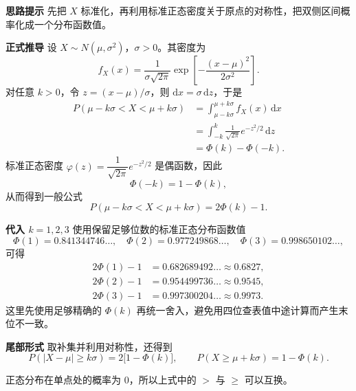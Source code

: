 \clearpage
\begin{proofbox}
	\textbf{\textcolor{CProof}{思路提示}}
	先把 $X$ 标准化，再利用标准正态密度关于原点的对称性，把双侧区间概率化成一个分布函数值。

	\medskip
	\textbf{\textcolor{CProof}{正式推导}}
	设 $X\sim N(\mu,\sigma^{2})$，$\sigma>0$。其密度为
	\[
		f_X(x)=\frac{1}{\sigma\sqrt{2\pi}}
		\exp\!\left[-\frac{(x-\mu)^2}{2\sigma^2}\right].
	\]
	对任意 $k>0$，令 $z=(x-\mu)/\sigma$，则 $\mathrm{d}x=\sigma\,\mathrm{d}z$，于是
	\[
		\begin{aligned}
			P(\mu-k\sigma<X<\mu+k\sigma)
			&=\int_{\mu-k\sigma}^{\mu+k\sigma}f_X(x)\,\mathrm{d}x\\
			&=\int_{-k}^{k}\frac{1}{\sqrt{2\pi}}e^{-z^{2}/2}\,\mathrm{d}z\\
			&=\Phi(k)-\Phi(-k).
		\end{aligned}
	\]
	标准正态密度 $\varphi(z)=\dfrac{1}{\sqrt{2\pi}}e^{-z^2/2}$ 是偶函数，因此
	\[
		\Phi(-k)=1-\Phi(k),
	\]
	从而得到一般公式
	\[
		P(\mu-k\sigma<X<\mu+k\sigma)=2\Phi(k)-1.
	\]

	\medskip
	\textbf{\textcolor{CProof}{代入 $k=1,2,3$}}
	使用保留足够位数的标准正态分布函数值
	\[
		\Phi(1)=0.841344746\ldots,\quad
		\Phi(2)=0.977249868\ldots,\quad
		\Phi(3)=0.998650102\ldots,
	\]
	可得
	\[
		\begin{aligned}
			2\Phi(1)-1&=0.682689492\ldots\approx0.6827,\\
			2\Phi(2)-1&=0.954499736\ldots\approx0.9545,\\
			2\Phi(3)-1&=0.997300204\ldots\approx0.9973.
		\end{aligned}
	\]
	这里先使用足够精确的 $\Phi(k)$ 再统一舍入，避免用四位查表值中途计算而产生末位不一致。
\end{proofbox}

\clearpage
\begin{proofbox}
	\textbf{\textcolor{CProof}{尾部形式}}
	取补集并利用对称性，还得到
	\[
		P(|X-\mu|\ge k\sigma)=2\bigl[1-\Phi(k)\bigr],\qquad
		P(X\ge\mu+k\sigma)=1-\Phi(k).
	\]
	

	正态分布在单点处的概率为 $0$，所以上式中的 $>$ 与 $\ge$ 可以互换。
\end{proofbox}
